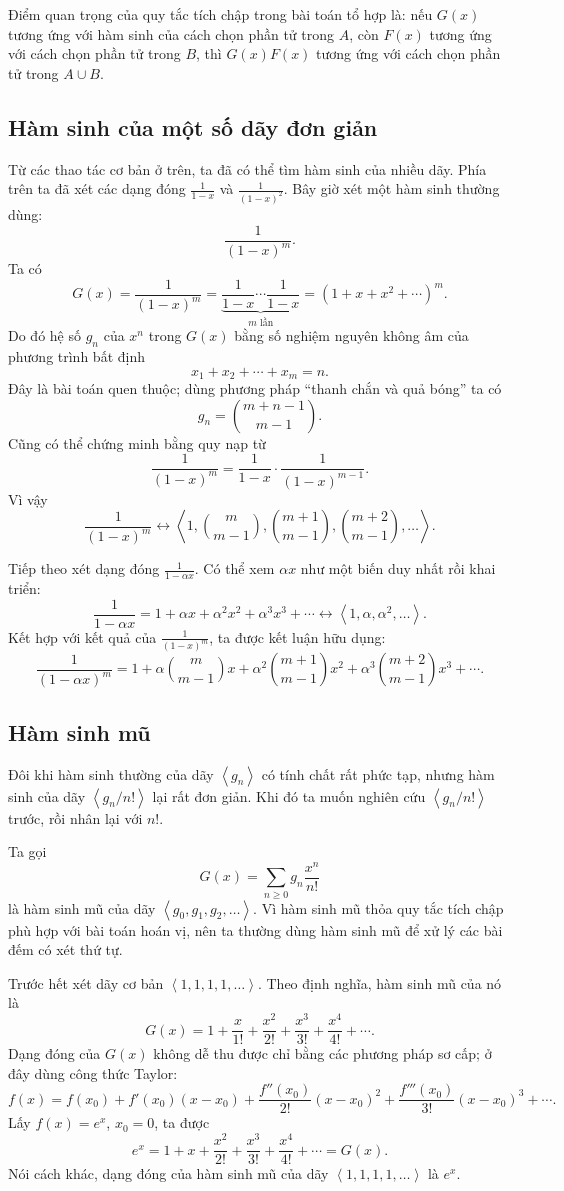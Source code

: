 \documentclass[11pt]{article}
\newcommand{\seq}[1]{\left\langle #1\right\rangle}
\newcommand{\C}[2]{\binom{#1}{#2}}
\begin{document}
Điểm quan trọng của quy tắc tích chập trong bài toán tổ hợp là: nếu \(G(x)\)
tương ứng với hàm sinh của cách chọn phần tử trong \(A\), còn \(F(x)\) tương
ứng với cách chọn phần tử trong \(B\), thì \(G(x)F(x)\) tương ứng với cách
chọn phần tử trong \(A\cup B\).

\subsection{Hàm sinh của một số dãy đơn giản}

Từ các thao tác cơ bản ở trên, ta đã có thể tìm hàm sinh của nhiều dãy.
Phía trên ta đã xét các dạng đóng \(\frac1{1-x}\) và
\(\frac1{(1-x)^2}\). Bây giờ xét một hàm sinh thường dùng:
\[
  \frac1{(1-x)^m}.
\]
Ta có
\[
  G(x)=\frac1{(1-x)^m}
      =\underbrace{\frac1{1-x}\cdots\frac1{1-x}}_{m\text{ lần}}
      =(1+x+x^2+\cdots)^m.
\]
Do đó hệ số \(g_n\) của \(x^n\) trong \(G(x)\) bằng số nghiệm nguyên không âm
của phương trình bất định
\[
  x_1+x_2+\cdots+x_m=n.
\]
Đây là bài toán quen thuộc; dùng phương pháp ``thanh chắn và quả bóng'' ta có
\[
  g_n=\C{m+n-1}{m-1}.
\]
Cũng có thể chứng minh bằng quy nạp từ
\[
  \frac1{(1-x)^m}=\frac1{1-x}\cdot\frac1{(1-x)^{m-1}}.
\]
Vì vậy
\[
  \frac1{(1-x)^m}
  \longleftrightarrow
  \seq{1,\C{m}{m-1},\C{m+1}{m-1},\C{m+2}{m-1},\ldots}.
\]

Tiếp theo xét dạng đóng \(\frac1{1-\alpha x}\). Có thể xem \(\alpha x\) như
một biến duy nhất rồi khai triển:
\[
  \frac1{1-\alpha x}
  =1+\alpha x+\alpha^2x^2+\alpha^3x^3+\cdots
  \longleftrightarrow \seq{1,\alpha,\alpha^2,\ldots}.
\]
Kết hợp với kết quả của \(\frac1{(1-x)^m}\), ta được kết luận hữu dụng:
\[
  \frac1{(1-\alpha x)^m}
  =1+\alpha\C{m}{m-1}x+\alpha^2\C{m+1}{m-1}x^2
   +\alpha^3\C{m+2}{m-1}x^3+\cdots.
\]

\subsection{Hàm sinh mũ}

Đôi khi hàm sinh thường của dãy \(\seq{g_n}\) có tính chất rất phức tạp,
nhưng hàm sinh của dãy \(\seq{g_n/n!}\) lại rất đơn giản. Khi đó ta muốn
nghiên cứu \(\seq{g_n/n!}\) trước, rồi nhân lại với \(n!\).

Ta gọi
\[
  G(x)=\sum_{n\ge 0} g_n\frac{x^n}{n!}
\]
là hàm sinh mũ của dãy \(\seq{g_0,g_1,g_2,\ldots}\). Vì hàm sinh mũ thỏa quy
tắc tích chập phù hợp với bài toán hoán vị, nên ta thường dùng hàm sinh mũ để
xử lý các bài đếm có xét thứ tự.

Trước hết xét dãy cơ bản \(\seq{1,1,1,1,\ldots}\). Theo định nghĩa, hàm sinh
mũ của nó là
\[
  G(x)=1+\frac{x}{1!}+\frac{x^2}{2!}+\frac{x^3}{3!}+\frac{x^4}{4!}+\cdots.
\]
Dạng đóng của \(G(x)\) không dễ thu được chỉ bằng các phương pháp sơ cấp; ở
đây dùng công thức Taylor:
\[
  f(x)=f(x_0)+f'(x_0)(x-x_0)+\frac{f''(x_0)}{2!}(x-x_0)^2
       +\frac{f'''(x_0)}{3!}(x-x_0)^3+\cdots.
\]
Lấy \(f(x)=e^x\), \(x_0=0\), ta được
\[
  e^x=1+x+\frac{x^2}{2!}+\frac{x^3}{3!}+\frac{x^4}{4!}+\cdots=G(x).
\]
Nói cách khác, dạng đóng của hàm sinh mũ của dãy
\(\seq{1,1,1,1,\ldots}\) là \(e^x\).
\end{document}

